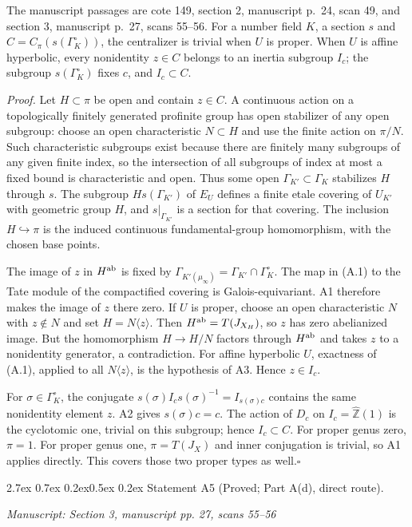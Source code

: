 \documentclass[11pt,a4paper]{article}
\makeatletter
\newcommand{\passage}[1]{\par\smallskip\noindent\textit{Manuscript: #1}\par\smallskip}
\renewcommand\paragraph{\@startsection{paragraph}{4}{\z@}%
  {2.7ex \@plus 0.7ex \@minus 0.2ex}{0.5ex \@plus 0.2ex}%
  {\normalfont\normalsize\bfseries}}
\makeatother
\begin{document}
The manuscript passages are cote 149, section 2, manuscript p.~24, scan 49, and section 3, manuscript p.~27, scans 55--56.
For a number field $K$, a section $s$ and $C=C_\pi(s(\Gamma_K^\circ))$, the centralizer is trivial when $U$ is proper. When $U$ is affine hyperbolic, every nonidentity $z\in C$ belongs to an inertia subgroup $I_c$; the subgroup $s(\Gamma_K^\circ)$ fixes $c$, and $I_c\subset C$.

\emph{Proof.} Let $H\subset\pi$ be open and contain $z\in C$. A continuous action on a topologically finitely generated profinite group has open stabilizer of any open subgroup: choose an open characteristic $N\subset H$ and use the finite action on $\pi/N$. Such characteristic subgroups exist because there are finitely many subgroups of any given finite index, so the intersection of all subgroups of index at most a fixed bound is characteristic and open. Thus some open $\Gamma_{K'}\subset\Gamma_K$ stabilizes $H$ through $s$. The subgroup $H s(\Gamma_{K'})$ of $E_U$ defines a finite etale covering of $U_{K'}$ with geometric group $H$, and $s|_{\Gamma_{K'}}$ is a section for that covering. The inclusion $H\hookrightarrow\pi$ is the induced continuous fundamental-group homomorphism, with the chosen base points.

The image of $z$ in $H^{\rm ab}$ is fixed by
$\Gamma_{K'(\mu_\infty)}=\Gamma_{K'}\cap\Gamma_K^\circ$. The map in (A.1) to the Tate module of the compactified covering is Galois-equivariant. A1 therefore makes the image of $z$ there zero. If $U$ is proper, choose an open characteristic $N$ with $z\notin N$ and set $H=N\langle z\rangle$. Then $H^{\rm ab}=T(J_{X_H})$, so $z$ has zero abelianized image. But the homomorphism $H\to H/N$ factors through $H^{\rm ab}$ and takes $z$ to a nonidentity generator, a contradiction. For affine hyperbolic $U$, exactness of (A.1), applied to all $N\langle z\rangle$, is the hypothesis of A3. Hence $z\in I_c$.

For $\sigma\in\Gamma_K^\circ$, the conjugate $s(\sigma)I_cs(\sigma)^{-1}=I_{s(\sigma)c}$ contains the same nonidentity element $z$. A2 gives $s(\sigma)c=c$. The action of $D_c$ on $I_c=\widehat{\mathbb Z}(1)$ is the cyclotomic one, trivial on this subgroup; hence $I_c\subset C$. For proper genus zero, $\pi=1$. For proper genus one, $\pi=T(J_X)$ and inner conjugation is trivial, so A1 applies directly. This covers those two proper types as well.\hfill$\square$

\paragraph{Statement A5 (Proved; Part A(d), direct route).}\label{res:A5}
\passage{Section 3, manuscript pp. 27, scans 55–56}
\end{document}

